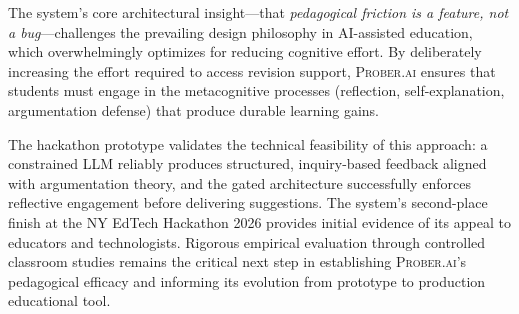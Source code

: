 \documentclass[11pt,a4paper]{article}
\begin{document}
The system's core architectural insight---that \textit{pedagogical friction is a feature, not a bug}---challenges the prevailing design philosophy in AI-assisted education, which overwhelmingly optimizes for reducing cognitive effort. By deliberately increasing the effort required to access revision support, \textsc{Prober.ai} ensures that students must engage in the metacognitive processes (reflection, self-explanation, argumentation defense) that produce durable learning gains.

The hackathon prototype validates the technical feasibility of this approach: a constrained LLM reliably produces structured, inquiry-based feedback aligned with argumentation theory, and the gated architecture successfully enforces reflective engagement before delivering suggestions. The system's second-place finish at the NY EdTech Hackathon 2026 provides initial evidence of its appeal to educators and technologists. Rigorous empirical evaluation through controlled classroom studies remains the critical next step in establishing \textsc{Prober.ai}'s pedagogical efficacy and informing its evolution from prototype to production educational tool.
\end{document}

